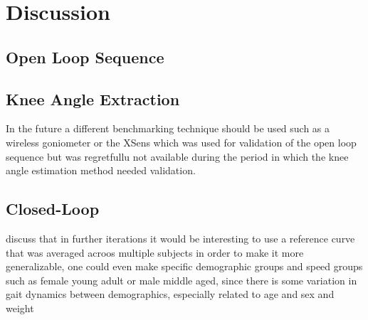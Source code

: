 
\section{Discussion}
\subsection{Open Loop Sequence}

\subsection{Knee Angle Extraction}

In the future a different benchmarking technique should be used such as a wireless goniometer or the XSens which was used for validation of the open loop sequence but was regretfullu not available during the period in which the knee angle estimation method needed validation.

\subsection{Closed-Loop}


discuss that in further iterations it would be interesting to use a reference curve that was averaged acroos multiple subjects in order to make it more generalizable, one could even make specific demographic groups and speed groups such as female young adult or male middle aged, since there is some variation in gait dynamics between demographics, especially related to age and sex and weight



